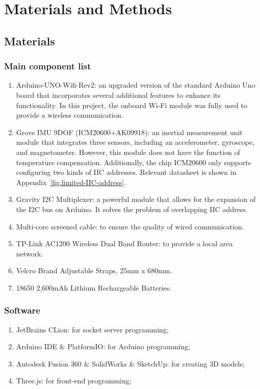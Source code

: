 \chapter{Materials and Methods}


\section{Materials}


\subsection{Main component list}
\begin{enumerate}
	\item   Arduino-UNO-Wifi-Rev2: an upgraded version of the standard Arduino Uno board that incorporates several additional features to enhance its functionality.
	In this project, the onboard Wi-Fi module was fully used to provide a wireless communication.
	\item   Grove IMU 9DOF (ICM20600+AK09918): an inertial measurement unit module that integrates three sensors, including an accelerometer, gyroscope, and magnetometer.
	However, this module does not have the function of temperature compensation.
	Additionally, the chip ICM20600 only supports configuring two kinds of IIC addresses.
	Relevant datasheet is shown in Appendix~\ref{fig:limited-IIC-address}.
	\item   Gravity I2C Multiplexer: a powerful module that allows for the expansion of the I2C bus on Arduino.
	It solves the problem of overlapping IIC address.
	\item   Multi-core screened cable: to ensure the quality of wired communication.
	\item   TP-Link AC1200 Wireless Dual Band Router: to provide a local area network.
	\item   Velcro Brand Adjustable Straps, 25mm x 680mm.
	\item   18650 2,600mAh Lithium Rechargeable Batteries.
\end{enumerate}


\subsection{Software}
\begin{enumerate}
	\item JetBrains CLion: for socket server programming;
	\item Arduino IDE \& PlatformIO: for Arduino programming;
	\item Autodesk Fusion 360 \& SolidWorks \& SketchUp: for creating 3D models;
	\item Three.js: for front-end programming;
\end{enumerate}



